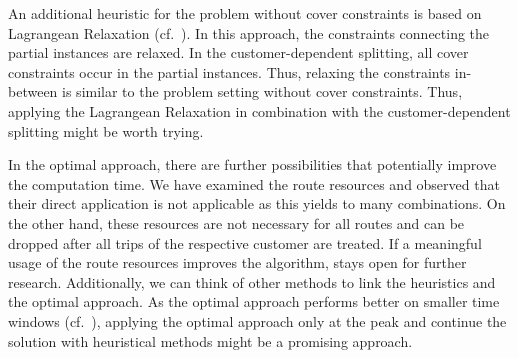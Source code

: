 An additional heuristic for the problem without cover constraints is based on Lagrangean Relaxation (cf.~\cite[Cap.~9]{Knoll}). In this approach, the constraints connecting the partial instances are relaxed. In the customer-dependent splitting, all cover constraints occur in the partial instances. Thus, relaxing the constraints in-between is similar to the problem setting without cover constraints. Thus, applying the Lagrangean Relaxation in combination with the customer-dependent splitting might be worth trying.

In the optimal approach, there are further possibilities that potentially improve the computation time. We have examined the route resources and observed that their direct application is not applicable as this yields to many combinations. On the other hand, these resources are not necessary for all routes and can be dropped after all trips of the respective customer are treated. If a meaningful usage of the route resources improves the algorithm, stays open for further research. Additionally, we can think of other methods to link the heuristics and the optimal approach. As the optimal approach performs better on smaller time windows (cf.~\cite[Sec.~10.2]{Kaiser}), applying the optimal approach only at the peak and continue the solution with heuristical methods might be a promising approach.